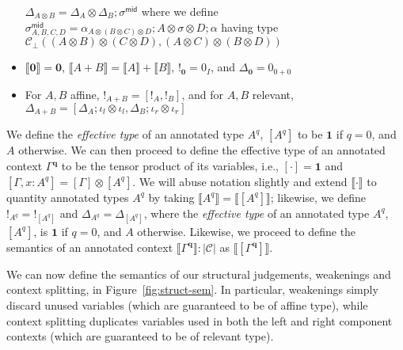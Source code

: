 \documentclass[acmsmall,screen,review]{acmart}
\newcommand{\mc}[1]{\ensuremath{\mathcal{#1}}}
\newcommand{\mb}[1]{\ensuremath{\mathbf{#1}}}
\newcommand{\ms}[1]{\ensuremath{\mathsf{#1}}}
\newcommand{\etoty}[1]{[#1]}
\newcommand{\dnt}[1]{\llbracket{#1}\rrbracket}
\newcommand{\dmor}[1]{{\Delta}_{#1}}
\newcommand{\subiterexp}{\texorpdfstring{\(\lambda_{\ms{iter}}\)}{lambda-iter}}
\begin{document}
\begin{definition}[\subiterexp-model]
\begin{itemize}
    $\Delta_{A \otimes B} 
      = \dmor{A} \otimes \dmor{B}
      ; \sigma^{\ms{mid}}
    $
    where we define
    $
    \sigma^{\ms{mid}}_{A, B, C, D} = 
      \alpha_{A \otimes (B \otimes C) \otimes D}
      ; A \otimes \sigma \otimes D
      ; \alpha
    $
    having type $\mc{C}_\bot(
        (A \otimes B) \otimes (C \otimes D), 
        (A \otimes C) \otimes (B \otimes D)
      )
    $
    \item $\dnt{\mb{0}} = \mb{0}$, $\dnt{A + B} = \dnt{A} + \dnt{B}$, 
          $!_{\mb{0}} = 0_{I}$, and $\Delta_{\mb{0}} = 0_{0 + 0}$
    \item For $A, B$ affine, $!_{A + B} = [!_A, !_B]$, and for $A, B$ relevant, 
    $\Delta_{A + B} 
      = [\dmor{A} ; \iota_l \otimes \iota_l, \dmor{B} ; \iota_r \otimes \iota_r]
    $
  \end{itemize}
\end{definition}
We define the \emph{effective type} of an annotated type $A^q$, $\etoty{A^q}$ to be $\mb{1}$ if
$q = 0$, and $A$ otherwise. We can then proceed to define the effective type of an annotated context
$\Gamma^{\mb{q}}$ to be the tensor product of its variables, i.e., $\etoty{\cdot} = \mb{1}$ and
$\etoty{\Gamma, x : A^q} = \etoty{\Gamma} \otimes \etoty{A^q}$. 
We will abuse notation slightly and extend $\dnt{\cdot}$ to quantity 
annotated types $A^q$ by taking $\dnt{A^q} = \dnt{\etoty{A^q}}$; likewise, we define $!_{A^q} =
!_{\etoty{A^q}}$ and $\Delta_{A^q} = \Delta_{\etoty{A^q}}$, where the \emph{effective type} of an 
annotated type $A^q$, $\etoty{A^q}$, is $\mb{1}$ if $q = 0$, and $A$ otherwise. 
Likewise, we proceed to define the semantics of an annotated context 
$\dnt{\Gamma^{\mb{q}}} : |\mc{C}|$ as $\dnt{\etoty{\Gamma^{\mb{q}}}}$.

We can now define the semantics of our structural judgements, weakenings and context splitting, in
Figure~\ref{fig:struct-sem}. In particular, weakenings simply discard unused variables (which are
guaranteed to be of affine type), while context splitting duplicates variables used in both the left
and right component contexts (which are guaranteed to be of relevant type).
\end{document}
